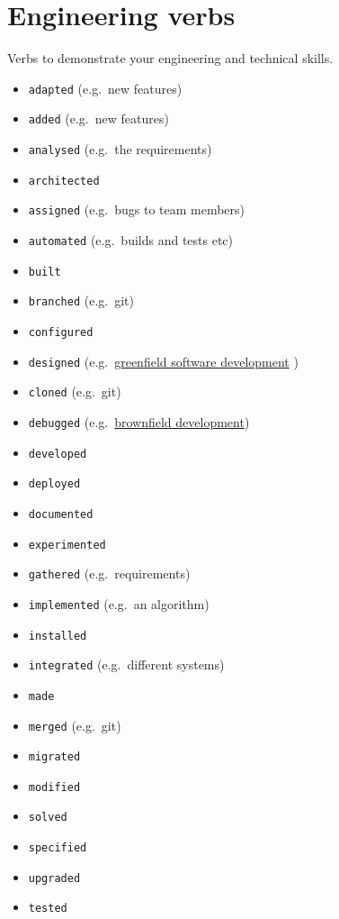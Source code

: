 \documentclass[
]{book}
\providecommand{\tightlist}{%
  \setlength{\itemsep}{0pt}\setlength{\parskip}{0pt}}
\begin{document}
\hypertarget{engineering}{%
\section{Engineering verbs}\label{engineering}}

Verbs to demonstrate your engineering and technical skills.

\begin{itemize}
\tightlist
\item
  \texttt{adapted} (e.g.~new features)
\item
  \texttt{added} (e.g.~new features)
\item
  \texttt{analysed} (e.g.~the requirements)
\item
  \texttt{architected}
\item
  \texttt{assigned} (e.g.~bugs to team members)
\item
  \texttt{automated} (e.g.~builds and tests etc)
\item
  \texttt{built}
\item
  \texttt{branched} (e.g.~git)
\item
  \texttt{configured}
\item
  \texttt{designed} (e.g.~\href{https://en.wikipedia.org/wiki/Greenfield_project}{greenfield software development} )
\item
  \texttt{cloned} (e.g.~git)
\item
  \texttt{debugged} (e.g.~\href{https://en.wikipedia.org/wiki/Brownfield_(software_development)}{brownfield development})
\item
  \texttt{developed}
\item
  \texttt{deployed}
\item
  \texttt{documented}
\item
  \texttt{experimented}
\item
  \texttt{gathered} (e.g.~requirements)
\item
  \texttt{implemented} (e.g.~an algorithm)
\item
  \texttt{installed}
\item
  \texttt{integrated} (e.g.~different systems)
\item
  \texttt{made}
\item
  \texttt{merged} (e.g.~git)
\item
  \texttt{migrated}
\item
  \texttt{modified}
\item
  \texttt{solved}
\item
  \texttt{specified}
\item
  \texttt{upgraded}
\item
  \texttt{tested}
\end{itemize}
\end{document}
